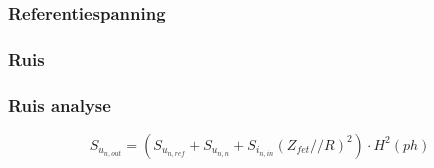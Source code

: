 
\begin{frame}
    \frametitle{Referentiespanning}
    


\end{frame}
\begin{frame}
    \frametitle{Ruis}
    


\end{frame}


\begin{frame}
    \frametitle{Ruis analyse}

    \begin{figure}
        \centering
        \def\svgwidth{0.7\textwidth}
        
    \end{figure}
    \begin{equation*}\label{eq:measureNoiseOut}
        S_{u_{{n,out}}} = \left(S_{u_{{n,ref}}} + S_{u_{{n,n}}} + S_{i_{{n,in}}}\left(Z_{fet} // R\right)^2\right) \cdot H^2(ph)
    \end{equation*}

\end{frame}
